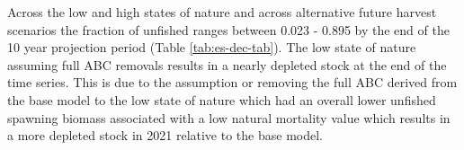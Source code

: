 \documentclass[11pt,
  english,
  a4paper,
]{article}
\begin{document}
\leavevmode\tagmcend\tagstructend\par


Across the low and high states of nature and across alternative future harvest scenarios the fraction of unfished ranges between 0.023 - 0.895 by the end of the 10 year projection period (Table \ref{tab:es-dec-tab}). The low state of nature assuming full ABC removals results in a nearly depleted stock at the end of the time series. This is due to the assumption or removing the full ABC derived from the base model to the low state of nature which had an overall lower unfished spawning biomass associated with a low natural mortality value which results in a more depleted stock in 2021 relative to the base model.

\leavevmode\tagmcend\tagstructend\par

\begingroup\fontsize{10}{12}\selectfont
\end{document}
